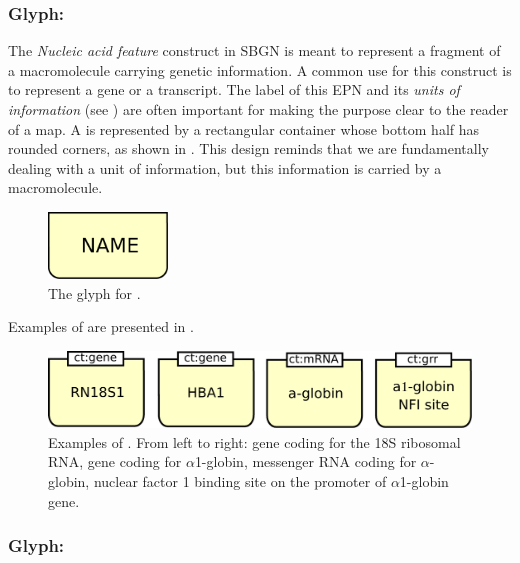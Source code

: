 \subsubsection{Glyph: }
\label{sec:genetic}

The \emph{Nucleic acid feature} construct in SBGN is meant to represent a fragment of a macromolecule carrying genetic information.  A common use for this construct is to represent a gene or a transcript.  The label of this EPN and its \emph{units of information} (see ) are often important for making the purpose clear to the reader of a map. A  is represented by a rectangular container whose bottom half has rounded corners, as shown in . This design reminds that we are fundamentally dealing with a unit of information, but this information is carried by a macromolecule.

\begin{figure}[htb]
  \centering
  \includegraphics[width = 1.25in]{le_images/genetic}
  \caption{The \PD glyph for .} 
  \label{fig:genetic}
\end{figure}

Examples of  are presented in .

\begin{figure}[htb]
  \centering
  \includegraphics[scale = 0.5]{le_images/NucAcidFeat-examples}
  \caption{Examples of . From left to right: gene coding for the 18S ribosomal RNA, gene coding for $\alpha$1-globin, messenger RNA coding for $\alpha$-globin, nuclear factor 1 binding site on the promoter of $\alpha$1-globin gene.}
  \label{fig:NucAcidFeat-examples}
\end{figure}

\subsubsection{Glyph: }\label{sec:complex}

